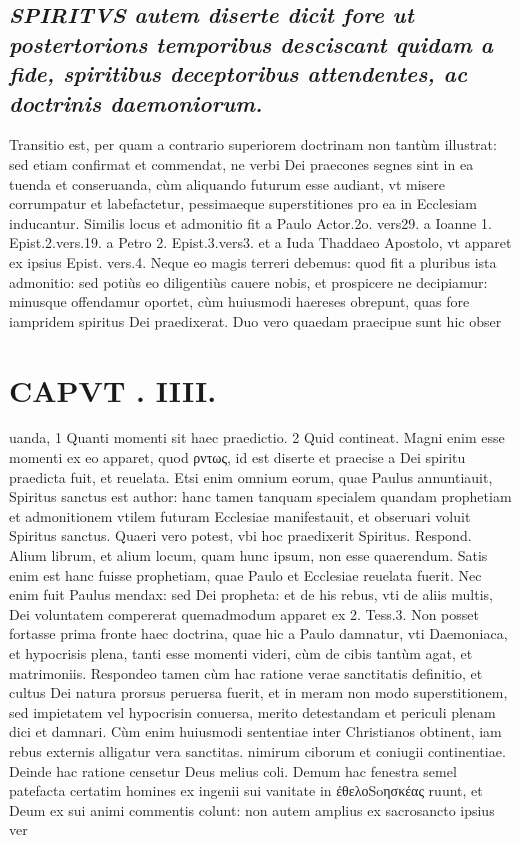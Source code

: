 \documentclass{article}
\begin{document}
\begin{pages}
\subsection*{\textit{\huge\textbf{S}\normalsize PIRITVS autem diserte dicit fore ut postertorions temporibus desciscant quidam a fide, spiritibus deceptoribus attendentes, ac doctrinis daemoniorum. }}\pstart Transitio est, per quam a contrario superiorem doctrinam non tantùm illustrat: sed etiam confirmat et commendat, ne verbi Dei praecones segnes sint in ea tuenda et conseruanda, cùm aliquando futurum esse audiant, vt misere corrumpatur et labefactetur, pessimaeque superstitiones pro ea in Ecclesiam inducantur. Similis locus et admonitio fit a Paulo Actor.2o. vers29. a Ioanne 1. Epist.2.vers.19. a Petro 2. Epist.3.vers3. et a Iuda Thaddaeo Apostolo, vt apparet ex ipsius Epist. vers.4. Neque eo magis terreri debemus: quod fit a pluribus ista admonitio: sed potiùs eo diligentiùs cauere nobis, et prospicere ne decipiamur: minusque offendamur oportet, cùm huiusmodi haereses obrepunt, quas fore iampridem spiritus Dei praedixerat.  \pend\pstart Duo vero quaedam praecipue sunt hic obser\pend
\section*{CAPVT . IIII. }
\marginpar{[ p.181 ]}\pstart uanda, 1 Quanti momenti sit haec praedictio. 2 Quid contineat. Magni enim esse momenti ex eo apparet, quod ρντως, id est diserte et praecise a Dei spiritu praedicta fuit, et reuelata. Etsi enim omnium eorum, quae Paulus annuntiauit, Spiritus sanctus est author: hanc tamen tanquam specialem quandam prophetiam et admonitionem vtilem futuram Ecclesiae manifestauit, et obseruari voluit Spiritus sanctus. Quaeri vero potest, vbi hoc praedixerit Spiritus. Respond. Alium librum, et alium locum, quam hunc ipsum, non esse quaerendum. Satis enim est hanc fuisse prophetiam, quae Paulo et Ecclesiae reuelata fuerit. Nec enim fuit Paulus mendax: sed Dei propheta: et de his rebus, vti de aliis multis, Dei voluntatem compererat quemadmodum apparet ex 2. Tess.3.  \pend\pstart Non posset fortasse prima fronte haec doctrina, quae hic a Paulo damnatur, vti Daemoniaca, et hypocrisis plena, tanti esse momenti videri, cùm de cibis tantùm agat, et matrimoniis. Respondeo tamen cùm hac ratione verae sanctitatis definitio, et cultus Dei natura prorsus peruersa fuerit, et in meram non modo superstitionem, sed impietatem vel hypocrisin conuersa, merito detestandam et periculi plenam dici et damnari. Cùm enim huiusmodi sententiae inter Christianos obtinent, iam rebus externis alligatur vera sanctitas. nimirum ciborum et coniugii continentiae. Deinde hac ratione censetur Deus melius coli. Demum hac fenestra semel patefacta certatim homines ex ingenii sui vanitate in ἐθελοSoησκέας ruunt, et Deum ex sui animi commentis colunt: non autem amplius ex sacrosancto ipsius ver\pend

\end{pages}
\end{document}
